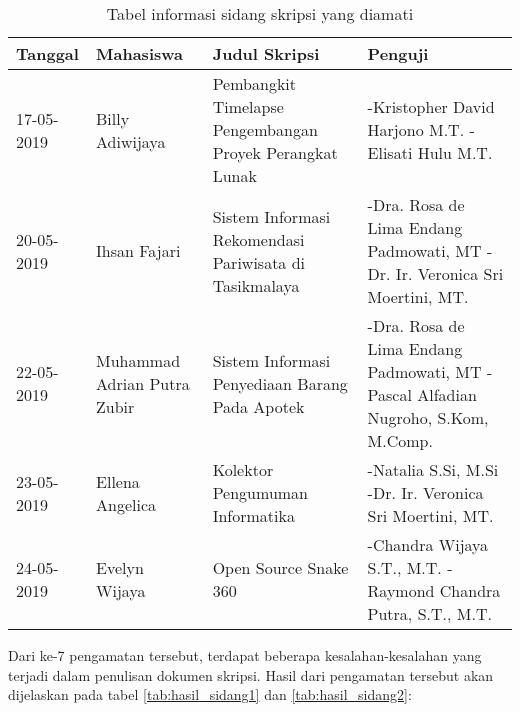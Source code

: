 \begin{table}[H]
	\renewcommand{\arraystretch}{1.5}
	\caption {Tabel informasi sidang skripsi yang diamati} 	
	\label{tab:pengamatan_sidang2}
	\begin{center}
		\begin{tabular}{|p{2 cm}|>{\raggedright} p{3.5 cm}| p{4.5 cm}| p{4.5 cm}|}
		\hline
		Tanggal & Mahasiswa & Judul Skripsi & Penguji \\ 
		\hline 
		17-05-2019 & Billy Adiwijaya & Pembangkit Timelapse Pengembangan Proyek Perangkat Lunak & -Kristopher David Harjono M.T. \newline -Elisati Hulu M.T. \newline \\ 		
		\hline
		20-05-2019 & Ihsan Fajari & Sistem Informasi Rekomendasi Pariwisata di Tasikmalaya & -Dra. Rosa de Lima Endang Padmowati, MT \newline -Dr. Ir. Veronica Sri Moertini, MT. \newline \\ 
		\hline 
		22-05-2019 & Muhammad Adrian Putra Zubir & Sistem Informasi Penyediaan Barang Pada Apotek & -Dra. Rosa de Lima Endang Padmowati, MT \newline -Pascal Alfadian Nugroho, S.Kom, M.Comp. \newline \\ 
		\hline 
		23-05-2019 & Ellena Angelica & Kolektor Pengumuman Informatika & -Natalia S.Si, M.Si \newline -Dr. Ir. Veronica Sri Moertini, MT. \newline \\ 
		\hline 
		24-05-2019 & Evelyn Wijaya & Open Source Snake 360 & -Chandra Wijaya S.T., M.T. \newline -Raymond Chandra Putra, S.T., M.T. \newline \\ 
		\hline 
		\end{tabular}
	\end{center}
\end{table}

Dari ke-7 pengamatan tersebut, terdapat beberapa kesalahan-kesalahan yang terjadi dalam penulisan dokumen skripsi. Hasil dari pengamatan tersebut akan dijelaskan pada tabel \ref{tab:hasil_sidang1} dan \ref{tab:hasil_sidang2}:

